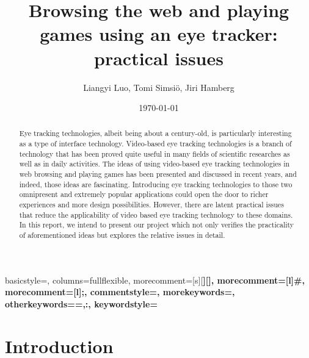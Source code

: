 \documentclass[english]{tktltiki}
\begin{document}
\onehalfspacing

{
    basicstyle=\ttfamily\small\singlespacing,
    columns=fullflexible,
    morecomment=[s][\color{Orchid}\bfseries]{[}{]},
    morecomment=[l]{\#},
    morecomment=[l]{;},
    commentstyle=\color{gray}\ttfamily,
    morekeywords={},
    otherkeywords={=,:},
    keywordstyle={\color{red}\bfseries}
}

\title{Browsing the web and playing games using an eye tracker: practical issues}
\author{Liangyi Luo, Tomi Simsiö, Jiri Hamberg }
\date{\today}

\maketitle



\begin{abstract}

Eye tracking technologies, albeit being about a century-old, is particularly interesting as a type of interface technology. Video-based eye tracking technologies is a branch of technology that has been proved quite useful in many fields of scientific researches as well as in daily activities. The ideas of using video-based eye tracking technologies in web browsing and playing games has been presented and discussed in recent years, and indeed, those ideas are fascinating. Introducing eye tracking technologies to those two omnipresent and extremely popular applications could open the door to richer experiences and more design possibilities. However, there are latent practical issues that reduce the applicability of video based eye tracking technology to these domains. In this report, we intend to present our project which not only verifies the practicality of aforementioned ideas but explores the relative issues in detail.   


\end{abstract}

\mytableofcontents




\section{Introduction}
\end{document}
